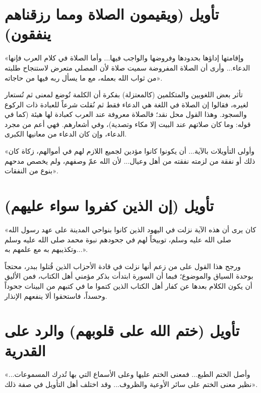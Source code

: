 \separator

\section{تأويل (ويقيمون الصلاة ومما رزقناهم ينفقون)}
 «وإقامتها إداؤها بحدودها وفروضها والواجب فيها... وأما الصلاة في كلام العرب فإنها الدعاء... وأرى أن الصلاة المفروضة سميت صلاة لأن المصلي متعرض لاستنجاح طلبته من ثواب الله بعمله، مع ما يسأل ربه فيها من حاجاته».

\begin{fawaid}
تأثر بعض اللغويين والمتكلمين (كالمعتزلة) بفكرة أن الكلمة تُوضع لمعنى ثم تُستعار لغيره، فقالوا إن الصلاة في اللغة هي الدعاء فقط ثم نُقلت شرعاً للعبادة ذات الركوع والسجود. وهذا القول محل نقد؛ فالصلاة معروفة عند العرب كعبادة لها هيئة (كما في قوله: وما كان صلاتهم عند البيت إلا مكاء وتصدية)، وفي أشعارهم. فهي أعم من مجرد الدعاء، وإن كان الدعاء من معانيها الكبرى.
\end{fawaid}

 «وأولى التأويلات بالآية... أن يكونوا كانوا مؤدين لجميع اللازم لهم في أموالهم، زكاة كان ذلك أو نفقة من لزمته نفقته من أهل وعيال... لأن الله عمّ وصفهم، ولم يخصص مدحهم بنوع من النفقات».

\separator

\section{تأويل (إن الذين كفروا سواء عليهم)}
 «كان  يرى أن هذه الآية نزلت في اليهود الذين كانوا بنواحي المدينة على عهد رسول الله صلى الله عليه وسلم، توبيخاً لهم في جحودهم نبوة محمد صلى الله عليه وسلم وتكذيبهم به مع علمهم به...».

ورجح  هذا القول على من زعم أنها نزلت في قادة الأحزاب الذين قُتلوا ببدر، محتجاً بوحدة السياق والموضوع؛ فبما أن السورة ابتدأت بذكر مؤمني أهل الكتاب، فمن الأليق أن يكون الكلام بعدها عن كفار أهل الكتاب الذين كتموا ما في كتبهم من البينات جحوداً وحسداً، فاستحقوا ألا ينفعهم الإنذار.

\separator

\section{تأويل (ختم الله على قلوبهم) والرد على القدرية}
 «وأصل الختم الطبع... فمعنى الختم عليها وعلى الأسماع التي بها تُدرك المسموعات... نظير معنى الختم على سائر الأوعية والظروف... وقد اختلف أهل التأويل في صفة ذلك».

